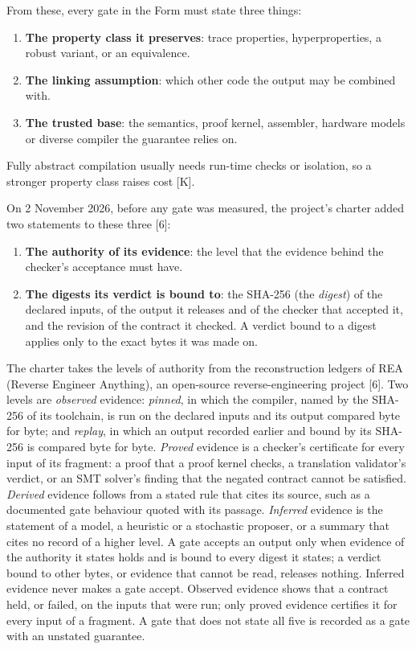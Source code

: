 \documentclass[10pt,letterpaper]{article}
\providecommand{\tightlist}{\setlength{\itemsep}{1pt}\setlength{\parskip}{0pt}}
\begin{document}
From these, every gate in the Form must state three things:

\begin{enumerate}
\def\labelenumi{\arabic{enumi}.}
\tightlist
\item
  \textbf{The property class it preserves}: trace properties,
  hyperproperties, a robust variant, or an equivalence.
\item
  \textbf{The linking assumption}: which other code the output may be
  combined with.
\item
  \textbf{The trusted base}: the semantics, proof kernel, assembler,
  hardware models or diverse compiler the guarantee relies on.
\end{enumerate}

Fully abstract compilation usually needs run-time checks or isolation,
so a stronger property class raises cost {[}K{]}.

On 2 November 2026, before any gate was measured, the project's charter
added two statements to these three {[}6{]}:

\begin{enumerate}
\def\labelenumi{\arabic{enumi}.}
\setcounter{enumi}{3}
\tightlist
\item
  \textbf{The authority of its evidence}: the level that the evidence
  behind the checker's acceptance must have.
\item
  \textbf{The digests its verdict is bound to}: the SHA-256 (the
  \emph{digest}) of the declared inputs, of the output it releases and
  of the checker that accepted it, and the revision of the contract it
  checked. A verdict bound to a digest applies only to the exact bytes
  it was made on.
\end{enumerate}

The charter takes the levels of authority from the reconstruction
ledgers of REA (Reverse Engineer Anything), an open-source
reverse-engineering project {[}6{]}. Two levels are \emph{observed}
evidence: \emph{pinned}, in which the compiler, named by the SHA-256 of
its toolchain, is run on the declared inputs and its output compared
byte for byte; and \emph{replay}, in which an output recorded earlier
and bound by its SHA-256 is compared byte for byte. \emph{Proved}
evidence is a checker's certificate for every input of its fragment: a
proof that a proof kernel checks, a translation validator's verdict, or
an SMT solver's finding that the negated contract cannot be satisfied.
\emph{Derived} evidence follows from a stated rule that cites its
source, such as a documented gate behaviour quoted with its passage.
\emph{Inferred} evidence is the statement of a model, a heuristic or a
stochastic proposer, or a summary that cites no record of a higher
level. A gate accepts an output only when evidence of the authority it
states holds and is bound to every digest it states; a verdict bound to
other bytes, or evidence that cannot be read, releases nothing. Inferred
evidence never makes a gate accept. Observed evidence shows that a
contract held, or failed, on the inputs that were run; only proved
evidence certifies it for every input of a fragment. A gate that does
not state all five is recorded as a gate with an unstated guarantee.
\end{document}
